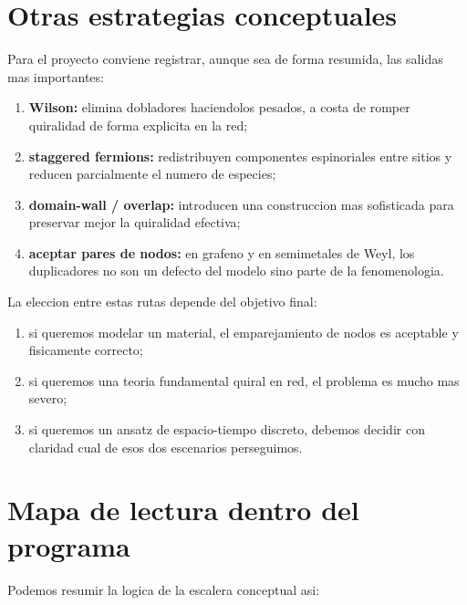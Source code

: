 \section{Otras estrategias conceptuales}

Para el proyecto conviene registrar, aunque sea de forma resumida, las salidas mas importantes:

\begin{enumerate}[leftmargin=*]
  \item \textbf{Wilson:} elimina dobladores haciendolos pesados, a costa de romper quiralidad de forma explicita en la red;
  \item \textbf{staggered fermions:} redistribuyen componentes espinoriales entre sitios y reducen parcialmente el numero de especies;
  \item \textbf{domain-wall / overlap:} introducen una construccion mas sofisticada para preservar mejor la quiralidad efectiva;
  \item \textbf{aceptar pares de nodos:} en grafeno y en semimetales de Weyl, los duplicadores no son un defecto del modelo sino parte de la fenomenologia.
\end{enumerate}

La eleccion entre estas rutas depende del objetivo final:

\begin{enumerate}[leftmargin=*]
  \item si queremos modelar un material, el emparejamiento de nodos es aceptable y fisicamente correcto;
  \item si queremos una teoria fundamental quiral en red, el problema es mucho mas severo;
  \item si queremos un ansatz de espacio-tiempo discreto, debemos decidir con claridad cual de esos dos escenarios perseguimos.
\end{enumerate}

\section{Mapa de lectura dentro del programa}

Podemos resumir la logica de la escalera conceptual asi:

